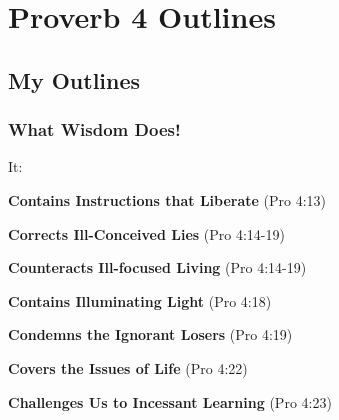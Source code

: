 \section{Proverb 4 Outlines}

\subsection{My Outlines}

\subsubsection{What Wisdom Does!}
It:
\begin{compactenum}[I.][8]
    \item \textbf{Contains Instructions that Liberate}  (Pro 4:13)
    \item \textbf{Corrects Ill-Conceived Lies}  (Pro 4:14-19)
    \item \textbf{Counteracts Ill-focused Living}  (Pro 4:14-19) 
    \item \textbf{Contains Illuminating Light} (Pro 4:18) 
    \item \textbf{Condemns the Ignorant Losers} (Pro 4:19)
    \item \textbf{Covers the Issues of Life} (Pro 4:22)
    \item \textbf{Challenges Us to Incessant Learning} (Pro 4:23) 
\end{compactenum}


